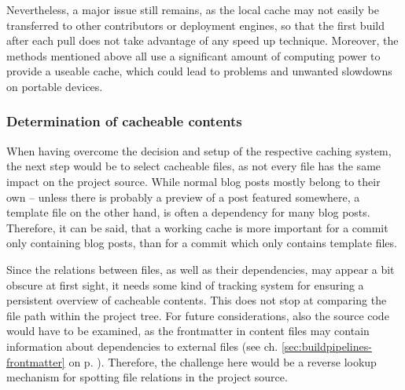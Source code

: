 Nevertheless, a major issue still remains, as the local cache may not easily be transferred to other contributors or deployment engines, so that the first build after each pull does not take advantage of any speed up technique. Moreover, the methods mentioned above all use a significant amount of computing power to provide a useable cache, which could lead to problems and unwanted slowdowns on portable devices.

\subsubsection{Determination of cacheable contents}
When having overcome the decision and setup of the respective caching system, the next step would be to select cacheable files, as not every file has the same impact on the project source. While normal blog posts mostly belong to their own --  unless there is probably a preview of a post featured somewhere, a template file on the other hand, is often a dependency for many blog posts. Therefore, it can be said, that a working cache is more important for a commit only containing blog posts, than for a commit which only contains template files.

Since the relations between files, as well as their dependencies, may appear a bit obscure at first sight, it needs some kind of tracking system for ensuring a persistent overview of cacheable contents. This does not stop at comparing the file path within the project tree. For future considerations, also the source code would have to be examined, as the frontmatter in content files may contain information about dependencies to external files (see ch. \ref{sec:buildpipelines-frontmatter} on p. \pageref{sec:buildpipelines-frontmatter}). Therefore, the challenge here would be a reverse lookup mechanism for spotting file relations in the project source.

